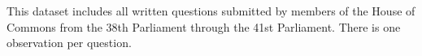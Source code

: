 
\memberid


\constituencyid

\billid

\motionid

\questionid


\myline

%
%
%
%
%
%
%
%
%
%
%
%
%
%
%
%
%
%
%
%
%
%
%
%
%
%
%
%
%
%
%
%


This dataset includes all written questions submitted by members of the House of Commons from the 38th Parliament through the 41st Parliament. There is one observation per question.

